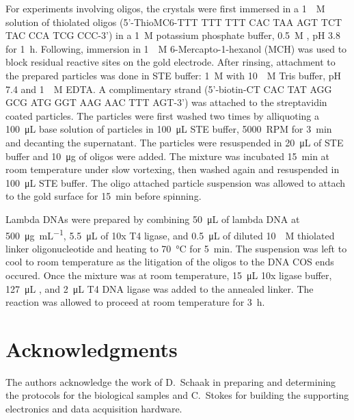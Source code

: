 \documentclass[floatfix,superscriptaddress,a4paper,twocolumn]{revtex4-1}
\begin{document}
For experiments involving oligos, the crystals were first immersed in a
\SI{1}{\micro\textsc{M}} solution of thiolated oligos (5'-ThioMC6-TTT TTT
TTT CAC TAA AGT TCT TAC CCA TCG CCC-3') in a \SI{1}{\textsc{M}} potassium
phosphate buffer, \SI{0.5}{\textsc{M}} , pH 3.8 for
\SI{1}{\hour}.  Following, immersion in \SI{1}{\milli\textsc{M}}
6-Mercapto-1-hexanol (MCH) was used to block residual reactive sites on the
gold electrode.  After rinsing, attachment to the prepared particles was
done in STE buffer: \SI{1}{\textsc{M}}  with
\SI{10}{\milli\textsc{M}} Tris buffer, pH 7.4 and \SI{1}{\milli\textsc{M}}
EDTA\@.  A complimentary strand (5'-biotin-CT CAC TAT AGG GCG ATG GGT AAG
AAC TTT AGT-3') was attached to the streptavidin coated particles.  The
particles were first washed two times by alliquoting a
\SI{100}{\micro\liter} base solution of particles in \SI{100}{\micro\liter}
STE buffer, \SI{5000}{RPM} for \SI{3}{\minute} and decanting the
supernatant.  The particles were resuspended in \SI{20}{\micro\liter} of
STE buffer and \SI{10}{\micro\gram} of oligos were added.  The mixture was
incubated \SI{15}{\minute} at room temperature under slow vortexing, then
washed again and resuspended in \SI{100}{\micro\liter} STE buffer.  The
oligo attached particle suspension was allowed to attach to the gold
surface for \SI{15}{\minute} before spinning.
 
Lambda DNAs were prepared by combining \SI{50}{\micro\liter} of lambda DNA
at \SI{500}{\micro\gram\per\milli\liter}, \SI{5.5}{\micro\liter} of 10x T4
ligase, and \SI{0.5}{\micro\liter} of diluted \SI{10}{\micro\textsc{M}}
thiolated linker oligonucleotide and heating to \SI{70}{\celsius} for
\SI{5}{\minute}.  The suspension was left to cool to room temperature as
the litigation of the oligos to the DNA COS ends occured. Once the mixture
was at room temperature, \SI{15}{\micro\liter} 10x ligase buffer,
\SI{127}{\micro\liter} , and \SI{2}{\micro\liter} T4 DNA ligase was
added to the annealed linker.  The reaction was allowed to proceed at room
temperature for \SI{3}{\hour}.

\section*{Acknowledgments}
\label{sec:acknowledgements}
The authors acknowledge the work of D\@.~Schaak in preparing and determining
the protocols for the biological samples and C\@.~Stokes for building the
supporting electronics and data acquisition hardware.
\end{document}
